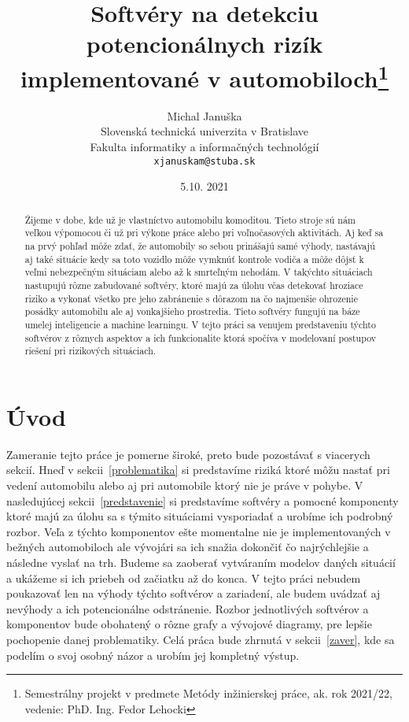 \documentclass[10pt,twoside,slovak,a4paper]{article}
\title{Softvéry na detekciu potencionálnych rizík 
implementované v automobiloch\thanks{Semestrálny projekt v predmete Metódy inžinierskej práce, ak. rok 2021/22, vedenie: PhD. Ing. Fedor Lehocki  }} %
\author{Michal Januška\\[2pt]
	{\small Slovenská technická univerzita v Bratislave}\\
	{\small Fakulta informatiky a informačných technológií}\\
	{\small \texttt{xjanuskam@stuba.sk}}
	}
\date{\small 5.10. 2021} %
\begin{document}
\maketitle

\begin{abstract}
Žijeme v dobe, kde už je vlastníctvo automobilu komoditou. Tieto stroje sú nám veľkou výpomocou či už pri výkone práce alebo pri voľnočasových aktivitách. Aj keď sa na prvý pohľad môže zdať, že automobily so sebou prinášajú samé výhody, nastávajú aj také situácie kedy sa toto vozidlo môže vymknúť kontrole vodiča a môže dôjsť  k veľmi nebezpečným situáciam alebo až k smrteľným nehodám. V takýchto situáciach nastupujú rôzne zabudované softvéry, ktoré majú za úlohu včas detekovať hroziace riziko a vykonať všetko pre jeho zabránenie s dôrazom na čo najmenšie ohrozenie posádky automobilu ale aj vonkajšieho prostredia. Tieto softvéry fungujú na báze umelej inteligencie a machine learningu. V tejto práci sa venujem predstaveniu týchto softvérov z rôznych aspektov a ich funkcionalite ktorá spočíva v modelovaní postupov riešení pri rizikových situáciach.
\end{abstract}



\section{Úvod}\label{uvod}

Zameranie tejto práce je pomerne široké, preto bude pozostávať s viacerych sekcií. Hneď v sekcii~\ref{problematika} si predstavíme riziká ktoré môžu nastať pri vedení automobilu alebo aj pri automobile ktorý nie je práve v pohybe. V nasledujúcej sekcii~\ref{predstavenie} si predstavíme softvéry a pomocné komponenty ktoré majú za úlohu sa s týmito situáciami vysporiadať a urobíme ich podrobný rozbor. Veľa z týchto komponentov ešte momentalne nie je implementovaných v bežných automobiloch ale vývojári sa ich snažia dokončiť čo najrýchlejšie a následne vyslať na trh. Budeme sa zaoberať vytváraním modelov daných situácií a ukážeme si ich priebeh od začiatku až do konca. V tejto práci nebudem poukazovať len na výhody týchto softvérov a zariadení, ale budem uvádzať aj nevýhody a ich potencionálne odstránenie. Rozbor jednotlivých softvérov a komponentov bude obohatený o rôzne grafy a vývojové diagramy, pre lepšie pochopenie danej problematiky. Celá práca bude zhrnutá v sekcii~\ref{zaver}, kde sa podelím o svoj osobný názor a urobím jej kompletný výstup.
\end{document}
